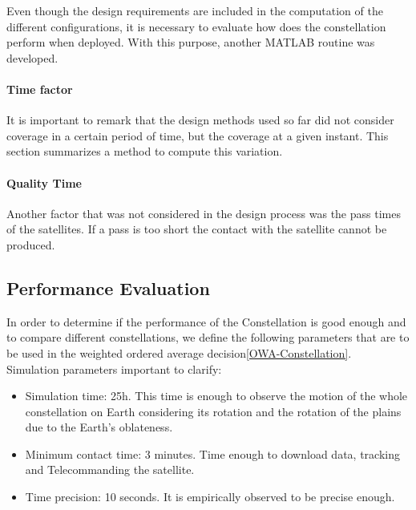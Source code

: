 Even though the design requirements are included in the computation of the different configurations, it is necessary to evaluate how does the constellation perform when deployed. With this purpose, another MATLAB routine was developed. 

\paragraph{Time factor\\}
It is important to remark that the design methods used so far did not consider coverage in a certain period of time, but the coverage at a given instant. This section summarizes a method to compute this variation.

\paragraph{Quality Time\\}
Another factor that was not considered in the design process was the pass times of the satellites. If a pass is too short the contact with the satellite cannot be produced. 

\subsection{Performance Evaluation}
In order to determine if the performance of the Constellation is good enough and to compare different constellations, we define the following parameters that are to be used in the weighted ordered average decision\ref{OWA-Constellation}.\\
\newline
Simulation parameters important to clarify:
\begin{itemize}
\item Simulation time: 25h. This time is enough to observe the motion of the whole constellation on Earth considering its rotation and the rotation of the plains due to the Earth's oblateness.
\item Minimum contact time: 3 minutes. Time enough to download data, tracking and Telecommanding the satellite.
\item Time precision: 10 seconds. It is empirically observed to be precise enough.
\end{itemize}

